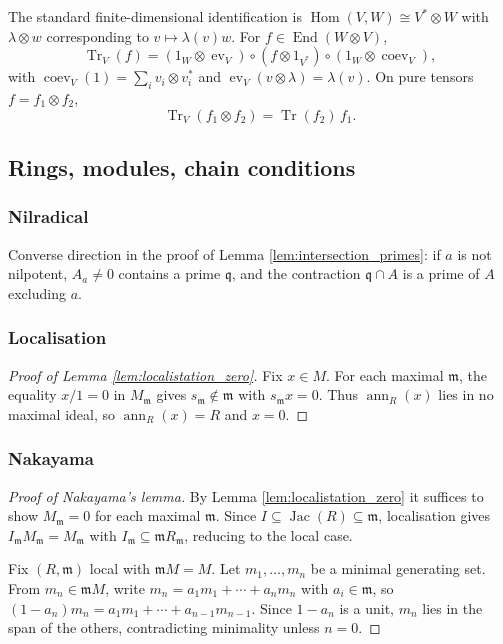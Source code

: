 \documentclass[12pt]{article}
\theoremstyle{plain}
\theoremstyle{definition}
\begin{document}
The standard finite-dimensional identification is $\operatorname{Hom}(V,W)\cong V^*\otimes W$ with $\lambda\otimes w$ corresponding to $v\mapsto\lambda(v)w$. For $f\in\operatorname{End}(W\otimes V)$,
\[
\operatorname{Tr}_V(f)=(1_W\otimes\operatorname{ev}_V)\circ(f\otimes 1_{V^*})\circ(1_W\otimes\operatorname{coev}_V),
\]
with $\operatorname{coev}_V(1)=\sum_i v_i\otimes v_i^*$ and $\operatorname{ev}_V(v\otimes\lambda)=\lambda(v)$. On pure tensors $f=f_1\otimes f_2$,
\[
\operatorname{Tr}_V(f_1\otimes f_2)=\operatorname{Tr}(f_2)\,f_1.
\]

\subsection{Rings, modules, chain conditions}

\subsubsection*{Nilradical}

Converse direction in the proof of Lemma \ref{lem:intersection_primes}: if $a$ is not nilpotent, $A_a\ne 0$ contains a prime $\mathfrak{q}$, and the contraction $\mathfrak{q}\cap A$ is a prime of $A$ excluding $a$.

\subsubsection*{Localisation}

\begin{proof}[Proof of Lemma \ref{lem:localistation_zero}]
Fix $x\in M$. For each maximal $\mathfrak{m}$, the equality $x/1=0$ in $M_{\mathfrak{m}}$ gives $s_{\mathfrak{m}}\notin\mathfrak{m}$ with $s_{\mathfrak{m}}x=0$. Thus $\operatorname{ann}_R(x)$ lies in no maximal ideal, so $\operatorname{ann}_R(x)=R$ and $x=0$.
\end{proof}

\subsubsection*{Nakayama}

\begin{proof}[Proof of Nakayama's lemma]
By Lemma \ref{lem:localistation_zero} it suffices to show $M_{\mathfrak{m}}=0$ for each maximal $\mathfrak{m}$. Since $I\subseteq\operatorname{Jac}(R)\subseteq\mathfrak{m}$, localisation gives $I_{\mathfrak{m}}M_{\mathfrak{m}}=M_{\mathfrak{m}}$ with $I_{\mathfrak{m}}\subseteq\mathfrak{m}R_{\mathfrak{m}}$, reducing to the local case.

Fix $(R,\mathfrak{m})$ local with $\mathfrak{m}M=M$. Let $m_1,\ldots,m_n$ be a minimal generating set. From $m_n\in\mathfrak{m}M$, write $m_n=a_1m_1+\cdots+a_nm_n$ with $a_i\in\mathfrak{m}$, so $(1-a_n)m_n=a_1m_1+\cdots+a_{n-1}m_{n-1}$. Since $1-a_n$ is a unit, $m_n$ lies in the span of the others, contradicting minimality unless $n=0$.
\end{proof}
\end{document}
